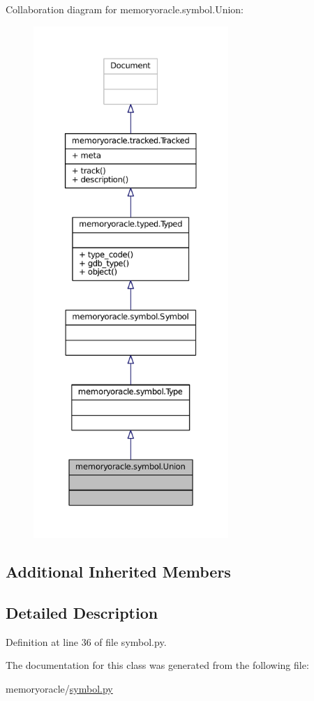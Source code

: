Collaboration diagram for memoryoracle.\+symbol.\+Union\+:
\nopagebreak
\begin{figure}[H]
\begin{center}
\leavevmode
\includegraphics[height=550pt]{classmemoryoracle_1_1symbol_1_1Union__coll__graph}
\end{center}
\end{figure}
\subsection*{Additional Inherited Members}


\subsection{Detailed Description}


Definition at line 36 of file symbol.\+py.



The documentation for this class was generated from the following file\+:\begin{DoxyCompactItemize}
\item 
memoryoracle/\hyperlink{symbol_8py}{symbol.\+py}\end{DoxyCompactItemize}
